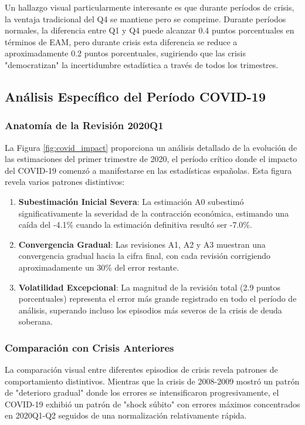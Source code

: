\documentclass{article}
\begin{document}
Un hallazgo visual particularmente interesante es que durante períodos de crisis, la ventaja tradicional del Q4 se mantiene pero se comprime. Durante períodos normales, la diferencia entre Q1 y Q4 puede alcanzar 0.4 puntos porcentuales en términos de EAM, pero durante crisis esta diferencia se reduce a aproximadamente 0.2 puntos porcentuales, sugiriendo que las crisis "democratizan" la incertidumbre estadística a través de todos los trimestres.

\subsection{Análisis Específico del Período COVID-19}

\subsubsection{Anatomía de la Revisión 2020Q1}

La Figura \ref{fig:covid_impact} proporciona un análisis detallado de la evolución de las estimaciones del primer trimestre de 2020, el período crítico donde el impacto del COVID-19 comenzó a manifestarse en las estadísticas españolas. Esta figura revela varios patrones distintivos:

\begin{enumerate}
\item \textbf{Subestimación Inicial Severa}: La estimación A0 subestimó significativamente la severidad de la contracción económica, estimando una caída del -4.1\% cuando la estimación definitiva resultó ser -7.0\%.

\item \textbf{Convergencia Gradual}: Las revisiones A1, A2 y A3 muestran una convergencia gradual hacia la cifra final, con cada revisión corrigiendo aproximadamente un 30\% del error restante.

\item \textbf{Volatilidad Excepcional}: La magnitud de la revisión total (2.9 puntos porcentuales) representa el error más grande registrado en todo el período de análisis, superando incluso los episodios más severos de la crisis de deuda soberana.
\end{enumerate}

\subsubsection{Comparación con Crisis Anteriores}

La comparación visual entre diferentes episodios de crisis revela patrones de comportamiento distintivos. Mientras que la crisis de 2008-2009 mostró un patrón de "deterioro gradual" donde los errores se intensificaron progresivamente, el COVID-19 exhibió un patrón de "shock súbito" con errores máximos concentrados en 2020Q1-Q2 seguidos de una normalización relativamente rápida.
\end{document}
